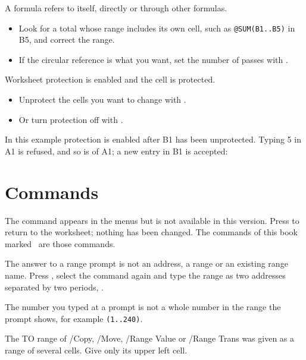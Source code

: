 \Solution A formula refers to itself, directly or through other formulas.
\begin{itemize}
\item Look for a total whose range includes its own cell, such as
  \texttt{@SUM(B1..B5)} in B5, and correct the range.
\item If the circular reference is what you want, set the number of passes
  with .
\end{itemize}

\Solution Worksheet protection is enabled and the cell is protected.
\begin{itemize}
\item Unprotect the cells you want to change with .
\item Or turn protection off with .
\end{itemize}
In this example protection is enabled after B1 has been unprotected.
Typing 5 in A1 is refused, and so is  of A1; a new
entry in B1 is accepted:


\section{Commands}
\Solution The command appears in the menus but is not available in this
version.  Press  to return to the worksheet; nothing has been
changed.  The commands of this book marked \DraftSample\ are those
commands.

\Solution The answer to a range prompt is not an address, a range or an
existing range name.  Press , select the command again and type
the range as two addresses separated by two periods, .

\Solution The number you typed at a prompt is not a whole number in the
range the prompt shows, for example \texttt{(1..240)}.

\Solution The TO range of /Copy, /Move, /Range Value or /Range Trans was
given as a range of several cells.  Give only its upper left cell.

